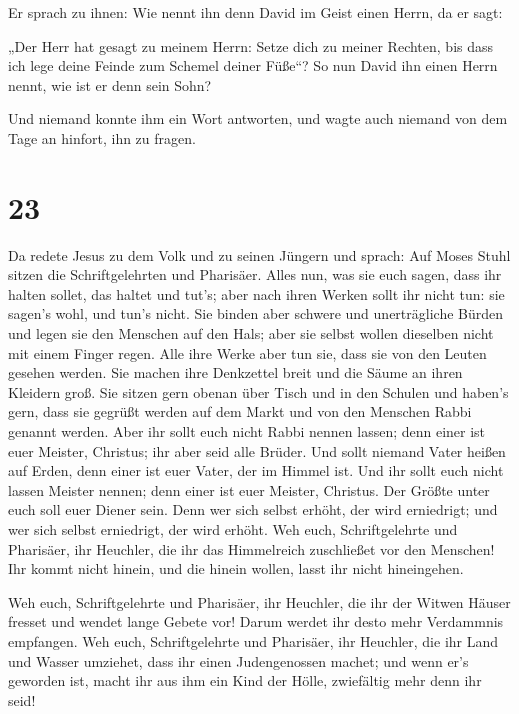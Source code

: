  Er sprach zu ihnen: Wie nennt ihn denn David im Geist
einen Herrn, da er sagt:

 „Der Herr hat gesagt zu meinem Herrn: Setze dich zu
meiner Rechten, bis dass ich lege deine Feinde zum Schemel deiner
Füße``?  So nun David ihn einen Herrn nennt, wie ist er
denn sein Sohn?

 Und niemand konnte ihm ein Wort antworten, und wagte
auch niemand von dem Tage an hinfort, ihn zu fragen.

\hypertarget{section-22}{%
\section{23}\label{section-22}}

 Da redete Jesus zu dem Volk und zu seinen Jüngern
 und sprach: Auf Moses Stuhl sitzen die Schriftgelehrten
und Pharisäer.  Alles nun, was sie euch sagen, dass ihr
halten sollet, das haltet und tut's; aber nach ihren Werken sollt ihr
nicht tun: sie sagen's wohl, und tun's nicht.  Sie binden
aber schwere und unerträgliche Bürden und legen sie den Menschen auf den
Hals; aber sie selbst wollen dieselben nicht mit einem Finger regen.
 Alle ihre Werke aber tun sie, dass sie von den Leuten
gesehen werden. Sie machen ihre Denkzettel breit und die Säume an ihren
Kleidern groß.  Sie sitzen gern obenan über Tisch und in
den Schulen  und haben's gern, dass sie gegrüßt werden auf
dem Markt und von den Menschen Rabbi genannt werden.  Aber
ihr sollt euch nicht Rabbi nennen lassen; denn einer ist euer Meister,
Christus; ihr aber seid alle Brüder.  Und sollt niemand
Vater heißen auf Erden, denn einer ist euer Vater, der im Himmel ist.
 Und ihr sollt euch nicht lassen Meister nennen; denn
einer ist euer Meister, Christus.  Der Größte unter euch
soll euer Diener sein.  Denn wer sich selbst erhöht, der
wird erniedrigt; und wer sich selbst erniedrigt, der wird erhöht.
 Weh euch, Schriftgelehrte und Pharisäer, ihr Heuchler,
die ihr das Himmelreich zuschließet vor den Menschen! Ihr kommt nicht
hinein, und die hinein wollen, lasst ihr nicht hineingehen.

 Weh euch, Schriftgelehrte und Pharisäer, ihr Heuchler,
die ihr der Witwen Häuser fresset und wendet lange Gebete vor! Darum
werdet ihr desto mehr Verdammnis empfangen.  Weh euch,
Schriftgelehrte und Pharisäer, ihr Heuchler, die ihr Land und Wasser
umziehet, dass ihr einen Judengenossen machet; und wenn er's geworden
ist, macht ihr aus ihm ein Kind der Hölle, zwiefältig mehr denn ihr
seid!

